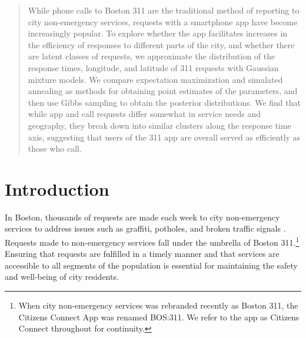 \documentclass[twoside]{article}
\theoremstyle{theorem}
\theoremstyle{theorem}
\theoremstyle{theorem}
\theoremstyle{lemma}
\theoremstyle{definition}
\theoremstyle{example}
\begin{document}

\makeatletter
\def\BState{\State\hskip-\ALG@thistlm}
\makeatother
%

%


\begin{abstract}
While phone calls to Boston 311 are the traditional method of reporting to city non-emergency services, requests with a smartphone app have become increasingly popular. To explore whether the app facilitates increases in the efficiency of responses to different parts of the city, and whether there are latent classes of requests, we approximate the distribution of the response times, longitude, and latitude of 311 requests with Gaussian mixture models. We compare expectation maximization and simulated annealing as methods for obtaining point estimates of the parameters, and then use Gibbs sampling to obtain the posterior distributions. We find that while app and call requests differ somewhat in service needs and geography, they break down into similar clusters along the response time axis, suggesting that users of the 311 app are overall served as efficiently as those who call. 
\end{abstract}
\section{Introduction}
In Boston, thousands of requests are made each week to city non-emergency services to address issues such as graffiti, potholes, and broken traffic signals \cite{walshpressrelease}. Requests made to non-emergency services fall under the umbrella of Boston 311.\footnote{When city non-emergency services was rebranded recently as Boston 311, the Citizens Connect App was renamed BOS:311. We refer to the app as Citizens Connect throughout for continuity.} Ensuring that requests are fulfilled in a timely manner and that services are accessible to all segments of the population is essential for maintaining the safety and well-being of city residents. 
\end{document}
